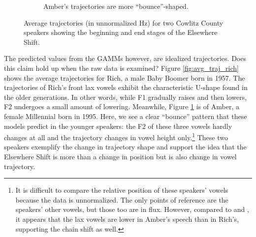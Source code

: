 \begin{figure}[tb!]
\begin{subfigure}[t]{2.925in}
        \caption{Amber's trajectories are more ``bounce''-shaped.}
        \label{fig:avg_traj_amber}
    \end{subfigure}
    \hspace{\fill}
    \caption{Average trajectories (in unnormalized Hz) for two Cowlitz County speakers showing the beginning and end stages of the Elsewhere Shift.}
    \label{fig:rich_and_amber}
\end{figure}

The predicted values from the GAMMs however, are idealized trajectories. Does this claim hold up when the raw data is examined? Figure \ref{fig:avg_traj_rich} shows the average trajectories for Rich, a male Baby Boomer born in 1957. The trajectories of Rich's front lax vowels exhibit the characteristic U-shape found in the older generations. In other words, while F1 gradually raises and then lowers, F2 undergoes a small amount of lowering. Meanwhile, Figure \ref{fig:avg_traj_amber} is of Amber, a female Millennial born in 1995. Here, we see a clear ``bounce'' pattern that these models predict in the younger speakers: the F2 of these three vowels hardly changes at all and the trajectory changes in vowel height only.\footnote{It is difficult to compare the relative position of these speakers' vowels because the data is unnormalized. The only points of reference are the speakers' other vowels, but those too are in flux. However, compared to \fleece and \face, it appears that the lax vowels are lower in Amber's speech than in Rich's, supporting the chain shift as well.} These two speakers exemplify the change in trajectory shape and support the idea that the Elsewhere Shift is more than a change in position but is also  change in vowel trajectory.

